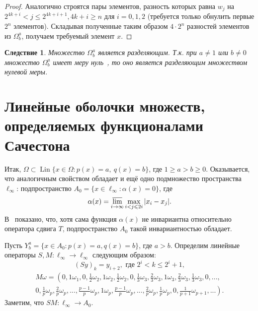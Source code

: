 \documentclass{article}
\theoremstyle{plain}
\newtheorem{corollary}{Следствие}
\theoremstyle{definition}
\newtheorem{proof}{Доказательство}\def\theproof{}
\begin{document}
\begin{fulltext}
\begin{proof}
	Аналогично строятся пары элементов, разность которых равна $w_j$ на $2^{4k+i} < j \leq 2^{4k+i+1}, 4k + i \geq n$ для $i=0,1,2$
	(требуется только обнулить первые $2^n$ элементов).
	Складывая полученные таким образом $4\cdot 2^n$ разностей элементов из $\Omega^a_b$, получаем требуемый элемент $x$.

\end{proof}

\begin{corollary}
	Множество $\Omega^a_b$ является разделяющим.
	Т.к. при $a\neq 1$ или $b\neq 0$ множество $\Omega^a_b$ имеет меру нуль~\cite{semenov2010characteristic,connor1990almost},
	то оно является разделяющим множеством нулевой меры.
\end{corollary}



\section{Линейные оболочки множеств, определяемых функционалами Сачестона}

Итак, $\Omega \subset \operatorname{Lin}\{x\in\Omega : p(x) = a,\ q(x) = b\}$, где $1\geq a>b\geq 0$.
Оказывается, что аналогичным свойством обладает и ещё одно подмножество пространства $\ell_\infty$: подпространство
$A_0 = \{ x \in \ell_\infty : \alpha(x) =0 \}$,
где~\cite{our-vzms-2018}
\begin{equation*}
	\alpha(x) = \varlimsup_{i\to\infty} \max_{i<j\leqslant 2i} |x_i - x_j|
	.
\end{equation*}
В~\cite{our-ped-2018-alpha-Tx} показано, что, хотя сама функция $\alpha(x)$ не инвариантна относительно оператора сдвига $T$,
подпространство $A_0$ такой инвариантностью обладает.

Пусть $Y^a_b = \{x\in A_0 : p(x) = a, q(x) = b\}$, где $a>b$.
Определим линейные операторы $S, M:\ell_\infty \to \ell_\infty$ следующим образом:
\begin{equation*}\label{operator_S}
	(Sy)_k = y_{i+2}, \mbox{ где } 2^i < k \leq 2^i+1
	,
\end{equation*}
\begin{multline*}
	M\omega=\left(
		0, 1\omega_1,
		0, \frac{1}{2}\omega_2, 1\omega_2, \frac{1}{2}\omega_2,
		0, \frac{1}{3}\omega_3, \frac{2}{3}\omega_3, 1\omega_3, \frac{2}{3}\omega_3, \frac{1}{3}\omega_3,
		0, ...,
	\right. \\ \left.
		0, \frac{1}{p}\omega_p, \frac{2}{p}\omega_p, ..., \frac{p-1}{p}\omega_p, 1\omega_p,
			\frac{p-1}{p}\omega_p, ..., \frac{2}{p}\omega_p, \frac{1}{p}\omega_p,
		0, \frac{1}{p+1}\omega_{p+1}, ...
	\right)
	.
\end{multline*}
Заметим, что $SM: \ell_\infty \to A_0$.


\end{fulltext}
\end{document}
